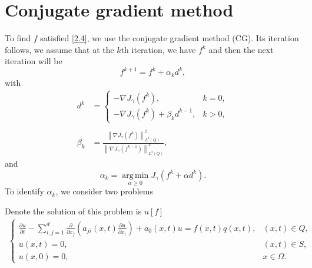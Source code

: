 \documentclass[]{article}
\begin{document}

\section{Conjugate gradient method}\label{section3}
\noindent To find $f$ satisfied \eqref{2.4}, we use the conjugate gradient method (CG). Its iteration follows, we assume that at the $k$th iteration, we have $f^k$ and then the next iteration will be
$$f^{k+1}=f^k+\alpha_kd^k,$$
with
\begin{align*}
	d^k&=\left\{\begin{array}{ll}
	-\nabla J_\gamma(f^k),& k=0,\\
	-\nabla J_\gamma(f^k)+\beta_kd^{k-1},& k>0,
	\end{array}\right.\\\\
	\beta_k&=\frac{\left\|\nabla J_\gamma (f^k)\right\|^2_{L^2(Q)}}{\left\|\nabla J_\gamma (f^{k-1})\right\|^2_{L^2(Q)}},
\end{align*}
and
$$\alpha_k=\operatorname*{arg\,min}_{\alpha\geq 0}J_\gamma(f^k+\alpha d^k).$$
To identify $\alpha_k$, we consider two problems
\begin{bt}\label{bt2.1}
	Denote the solution of this problem is $u[f]$
	\begin{align*}
		\begin{cases}
			\frac{\partial u}{\partial t}-\sum_{i, j=1}^{d}\frac{\partial}{\partial x_j}\left(a_{ji}(x, t)\frac{\partial u}{\partial x_i}\right)+a_0(x, t)u=f(x, t)q(x, t),&(x, t)\in Q,\\
			u(x, t)=0, & (x, t)\in S,\\
			u(x, 0)=0,&x\in \Omega.
		\end{cases}
	\end{align*}
\end{bt}
\end{document}

